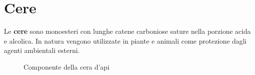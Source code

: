 \section{Cere}\label{sec:cere}
Le \textbf{cere} sono monoesteri con lunghe catene carboniose sature nella porzione acida e alcolica. In natura vengono utilizzate in piante e animali come protezione dagli agenti ambientali esterni.

\begin{figure}[H]
	\centering
	\caption{Componente della cera d'api}
\end{figure}

